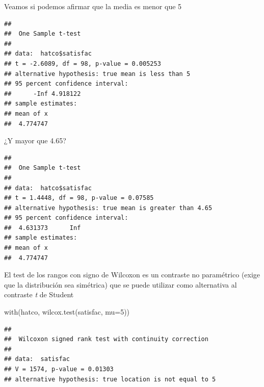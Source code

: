\documentclass[
]{book}
\newenvironment{Shaded}{\begin{snugshade}}{\end{snugshade}}
\newcommand{\AttributeTok}[1]{\textcolor[rgb]{0.77,0.63,0.00}{#1}}
\newcommand{\DecValTok}[1]{\textcolor[rgb]{0.00,0.00,0.81}{#1}}
\newcommand{\FloatTok}[1]{\textcolor[rgb]{0.00,0.00,0.81}{#1}}
\newcommand{\FunctionTok}[1]{\textcolor[rgb]{0.00,0.00,0.00}{#1}}
\newcommand{\NormalTok}[1]{#1}
\newcommand{\SpecialCharTok}[1]{\textcolor[rgb]{0.00,0.00,0.00}{#1}}
\newcommand{\StringTok}[1]{\textcolor[rgb]{0.31,0.60,0.02}{#1}}
\theoremstyle{break}
\theoremstyle{nonumberplain}
\begin{document}
Veamos si podemos afirmar que la media es menor que 5

\begin{Shaded}
\end{Shaded}

\begin{verbatim}
## 
##  One Sample t-test
## 
## data:  hatco$satisfac
## t = -2.6089, df = 98, p-value = 0.005253
## alternative hypothesis: true mean is less than 5
## 95 percent confidence interval:
##      -Inf 4.918122
## sample estimates:
## mean of x 
##  4.774747
\end{verbatim}

¿Y mayor que 4.65?

\begin{Shaded}
\end{Shaded}

\begin{verbatim}
## 
##  One Sample t-test
## 
## data:  hatco$satisfac
## t = 1.4448, df = 98, p-value = 0.07585
## alternative hypothesis: true mean is greater than 4.65
## 95 percent confidence interval:
##  4.631373      Inf
## sample estimates:
## mean of x 
##  4.774747
\end{verbatim}

El test de los rangos con signo de Wilcoxon es un contraste no paramétrico
(exige que la distribución sea simétrica) que se puede utilizar como
alternativa al contraste \emph{t} de Student

\begin{Shaded}
\begin{Highlighting}[]
\FunctionTok{with}\NormalTok{(hatco, }\FunctionTok{wilcox.test}\NormalTok{(satisfac, }\AttributeTok{mu=}\DecValTok{5}\NormalTok{))}
\end{Highlighting}
\end{Shaded}

\begin{verbatim}
## 
##  Wilcoxon signed rank test with continuity correction
## 
## data:  satisfac
## V = 1574, p-value = 0.01303
## alternative hypothesis: true location is not equal to 5
\end{verbatim}
\end{document}

